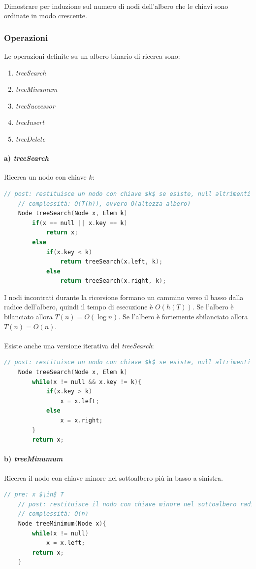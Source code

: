 \documentclass[italian]{article}
\newcommand{\homeExercize}{\text{\faHome $\;$ Esercizio per casa}}
\begin{document}
\paragraph{\homeExercize}
Dimostrare per induzione sul numero di nodi dell'albero che le chiavi sono ordinate in modo crescente. 

\subsubsection{Operazioni}
Le operazioni definite su un albero binario di ricerca sono:
\begin{enumerate}[label=\alph*),itemsep=0pt]
	\item \textit{treeSearch}
	\item \textit{treeMinumum}
	\item \textit{treeSuccessor}
	\item \textit{treeInsert}
	\item \textit{treeDelete}
\end{enumerate}
\paragraph{a) \textit{treeSearch}} Ricerca un nodo con chiave $k$:
\begin{lstlisting}[language=c,mathescape=true]
	// post: restituisce un nodo con chiave $k$ se esiste, null altrimenti
	// complessità: O(T(h)), ovvero O(altezza albero)
	Node treeSearch(Node x, Elem k)
		if(x == null || x.key == k)
			return x;
		else
			if(x.key < k)
				return treeSearch(x.left, k);
			else
				return treeSearch(x.right, k);
\end{lstlisting}
I nodi incontrati durante la ricorsione formano un cammino verso il basso dalla radice dell'albero, quindi il tempo di esecuzione è $O(h(T))$. Se l'albero è bilanciato allora $T(n) = O(\log n)$. Se l'albero è fortemente sbilanciato allora $T(n) = O(n)$. \\\\
Esiste anche una versione iterativa del \textit{treeSearch}:
\begin{lstlisting}[language=c,mathescape=true]
	// post: restituisce un nodo con chiave $k$ se esiste, null altrimenti
	Node treeSearch(Node x, Elem k)
		while(x != null && x.key != k){
			if(x.key > k)
				x = x.left;
			else
				x = x.right;
		}
		return x;
\end{lstlisting}
\paragraph{b) \textit{treeMinumum}} Ricerca il nodo con chiave minore nel sottoalbero più in basso a sinistra.
\begin{lstlisting}[language=c,mathescape=true]
	// pre: x $\in$ T
	// post: restituisce il nodo con chiave minore nel sottoalbero radicato in $x$
	// complessità: O(n)
	Node treeMinimum(Node x){
		while(x != null)
			x = x.left;
		return x;
	}
\end{lstlisting}
\end{document}
